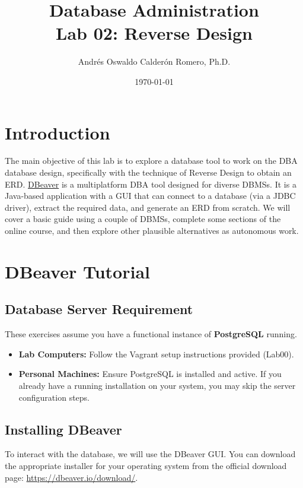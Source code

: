 \documentclass{article}
\title{Database Administration \\ Lab 02: Reverse Design}
\author{Andrés Oswaldo Calderón Romero, Ph.D.}
\date{\today}
\begin{document}
\maketitle

\section{Introduction}
The main objective of this lab is to explore a database tool to work on the DBA database design, specifically with the technique of Reverse Design to obtain an ERD. \href{https://dbeaver.io/}{DBeaver} is a multiplatform DBA tool designed for diverse DBMSs. It is a Java-based application with a GUI that can connect to a database (via a JDBC driver), extract the required data, and generate an ERD from scratch. We will cover a basic guide using a couple of DBMSs, complete some sections of the online course, and then explore other plausible alternatives as autonomous work.


\section{DBeaver Tutorial}

\subsection{Database Server Requirement}
These exercises assume you have a functional instance of \textbf{PostgreSQL} running.
\begin{itemize}
    \item \textbf{Lab Computers:} Follow the Vagrant setup instructions provided (Lab00).
    \item \textbf{Personal Machines:} Ensure PostgreSQL is installed and active. If you already have a running installation on your system, you may skip the server configuration steps.
\end{itemize}

\subsection{Installing DBeaver}
To interact with the database, we will use the DBeaver GUI. You can download the appropriate installer for your operating system from the official download page: \url{https://dbeaver.io/download/}.
\end{document}
